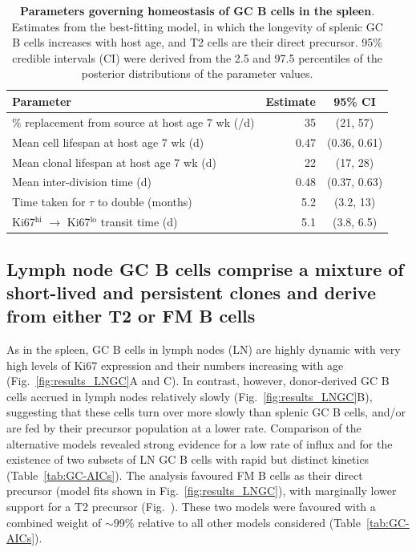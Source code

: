 \documentclass[12pt]{article}
\newcommand{\red}[1]{{\color{red}{#1}}}
\newcommand{\khi}{Ki67$^\text{hi}$}
\newcommand{\klo}{Ki67$^\text{lo}$}
\begin{document}
\begin{table}[htbp]
\begin{center}
		\renewcommand{\arraystretch}{1.25}
		{\small 
		\begin{tabular}{l r c}
			\toprule
			\textbf{Parameter}                                & \textbf{Estimate}   &   \textbf{95\% CI} \\
			\toprule
			\% replacement from source at  host age 7 wk (/d)            & 35                   & (21, 57)      \\
			Mean cell lifespan  at  host age 7 wk (d)                           & 0.47                 & (0.36, 0.61)  \\				
			Mean clonal lifespan at  host age 7 wk (d)                          & 22                   & (17, 28)      \\
			Mean inter-division time (d)                      & 0.48                 & (0.37, 0.63)  \\
			Time taken for $\tau$ to double (months)              & 5.2                  & (3.2, 13)      \\
			{\khi} $\rightarrow$ {\klo} transit time (d)      & 5.1                  & (3.8, 6.5)     \\					
			\hline
			\toprule 
		\end{tabular}
		}
	\end{center}
	\caption{ \textbf{Parameters governing homeostasis of GC B cells in the spleen}. Estimates from the best-fitting  model, in which the longevity of splenic GC B cells increases with host age, and T2 cells are their direct precursor.  95\% credible intervals (CI) were derived from the 2.5 and 97.5 percentiles of the posterior distributions of the parameter values.}
	\label{tab:SPGC-parestm}
\end{table} 
	
\subsection*{Lymph node GC B cells comprise a mixture of short-lived and persistent clones and derive from either T2 or FM B cells}

As in the spleen, GC B cells in lymph nodes (LN) are highly dynamic with very high levels of Ki67 expression and their numbers increasing  with age (Fig.~\ref{fig:results_LNGC}A and C). In contrast, however, donor-derived GC B cells accrued in lymph nodes relatively slowly (Fig.~\ref{fig:results_LNGC}B), suggesting that these cells turn over more slowly than splenic GC B cells, and/or are fed by their precursor population at a  lower rate.  Comparison of the alternative  models revealed strong evidence for a low rate of influx and for the existence of two subsets of LN GC B cells with rapid but distinct kinetics (Table~\ref{tab:GC-AICs}). The analysis favoured FM B cells as their direct precursor (model fits shown in Fig.~\ref{fig:results_LNGC}), with marginally lower support for a T2 precursor (Fig.~\red{SI????]}). These two models were favoured with a combined weight of $\sim$99\% relative to all other models considered (Table~\ref{tab:GC-AICs}). 
\end{document}
